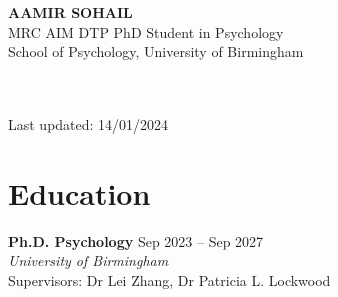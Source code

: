 \documentclass[a4paper,10pt]{article}
\begin{document}
\begin{center}
    \textbf{\Huge \scshape AAMIR SOHAIL} \\ \vspace{8pt}
    {\large MRC AIM DTP PhD Student in Psychology} \\ \vspace{1pt}
    {\large School of Psychology, University of Birmingham} \\ \vspace{8pt}

\raisebox{-0.5\height}{\LARGE \textcolor{orcidgreen}{\faOrcid}}\ \href{https://orcid.org/0000-0002-6584-4579}{\raisebox{-0.5\height}{0000-0002-6584-4579}} \quad \quad
\raisebox{-0.5\height}{\LARGE \textcolor{linkedinblue}{\faLinkedin}}\ \href{https://www.linkedin.com/in/aamir-sohail-3a42b9293}{\raisebox{-0.5\height}{aamir-sohail-3a42b9293}} \\
\vspace{5pt} 
\raisebox{-0.5\height}{\LARGE \textcolor{emailbrown}{\faEnvelope}}\ \href{mailto:axs2210@bham.ac.uk}{\raisebox{-0.5\height}{axs2210@student.bham.ac.uk}} \quad  \quad
\raisebox{-0.5\height}{\LARGE \textcolor{websiteblue}{\faGlobe}}\ \href{https://sohaamir.github.io}{\raisebox{-0.5\height}{https://sohaamir.github.io}}
\vspace{8pt} \\
Last updated: 14/01/2024
\end{center}

\section{Education}
\vspace{2.5pt}
\begin{adjustwidth}{0em}{0pt}
\textbf{Ph.D. Psychology} \hfill {Sep 2023 -- Sep 2027} \\
\emph{University of Birmingham} \\
Supervisors: Dr Lei Zhang, Dr Patricia L. Lockwood
\end{adjustwidth}

\vspace{8pt} %
\end{document}
